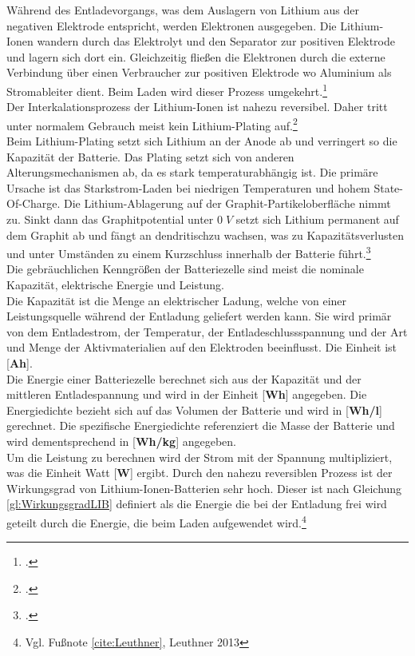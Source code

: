 Während des Entladevorgangs, was dem Auslagern von Lithium aus der negativen Elektrode entspricht, werden Elektronen ausgegeben. Die Lithium-Ionen wandern durch das Elektrolyt und den Separator zur positiven Elektrode und lagern sich dort ein. Gleichzeitig fließen die Elektronen durch die externe Verbindung über einen Verbraucher zur positiven Elektrode wo Aluminium als Stromableiter dient. Beim Laden wird dieser Prozess umgekehrt.\footcite[Vgl.\label{cite:Leuthner}][S. 13-19]{Leuthner.2013}\\
Der Interkalationsprozess der Lithium-Ionen ist nahezu reversibel. Daher tritt unter normalem Gebrauch meist kein Lithium-Plating auf.\footcite[Vgl.][S. 265-270]{DAHN1994}\\
Beim Lithium-Plating setzt sich Lithium an der Anode ab und verringert so die Kapazität der Batterie. Das Plating setzt sich von anderen Alterungsmechanismen ab, da es stark temperaturabhängig ist. Die primäre Ursache ist das Starkstrom-Laden bei niedrigen Temperaturen und hohem State-Of-Charge. Die Lithium-Ablagerung auf der Graphit-Partikeloberfläche nimmt zu. Sinkt dann das Graphitpotential unter $0\; V$ setzt sich Lithium permanent auf dem Graphit ab und fängt an dendritischzu wachsen, was zu Kapazitätsverlusten und unter Umständen zu einem Kurzschluss innerhalb der Batterie führt.\footcite[Vgl.][S. 799-807]{Petzl.2015}\\


Die gebräuchlichen Kenngrößen der Batteriezelle sind meist die nominale Kapazität, elektrische Energie und Leistung. \\
Die Kapazität ist die Menge an elektrischer Ladung, welche von einer Leistungsquelle während der Entladung geliefert werden kann. Sie wird primär von dem Entladestrom, der Temperatur, der Entladeschlussspannung und der Art und Menge der Aktivmaterialien auf den Elektroden beeinflusst. Die Einheit ist [\textbf{Ah}].\\
Die Energie einer Batteriezelle berechnet sich aus der Kapazität und der mittleren Entladespannung und wird in der Einheit [\textbf{Wh}] angegeben. Die Energiedichte bezieht sich auf das Volumen der Batterie und wird in [\textbf{Wh/l}] gerechnet. Die spezifische Energiedichte referenziert die Masse der Batterie und wird dementsprechend in [\textbf{Wh/kg}] angegeben.\\
Um die Leistung zu berechnen wird der Strom mit der Spannung multipliziert, was die Einheit Watt [\textbf{W}] ergibt. Durch den nahezu reversiblen Prozess ist der Wirkungsgrad von Lithium-Ionen-Batterien sehr hoch. Dieser ist nach Gleichung \ref{gl:WirkungsgradLIB} definiert als die Energie die bei der Entladung frei wird geteilt durch die Energie, die beim Laden aufgewendet wird.\footnote{Vgl. Fußnote \ref{cite:Leuthner}, Leuthner 2013}\\

